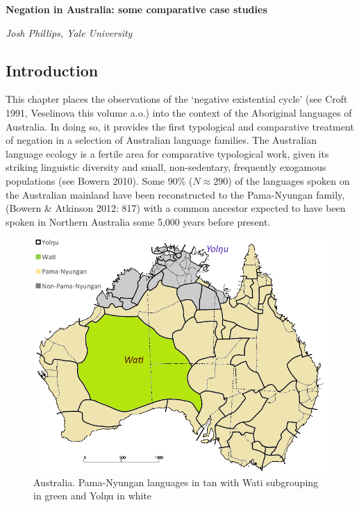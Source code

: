 \documentclass[10.5pt]{article}
\begin{document}
{\large \textbf{Negation in Australia: some comparative case studies}}

\textit{Josh Phillips, Yale University}

\subsection*{Introduction}
This chapter places the observations of the `negative existential cycle' (see Croft 1991, Veselinova this volume a.o.) into the context of the Aboriginal languages of Australia. In doing so, it provides the first typological and comparative treatment of negation in a selection of Australian language families. The Australian language ecology is a fertile area for comparative typological work, given its striking linguistic diversity and small, non-sedentary, frequently exogamous populations (see Bowern 2010). Some 90\% ($N\approx290$) of the languages spoken on the Australian mainland have been reconstructed to the Pama-Nyungan family, (Bowern \& Atkinson 2012: 817) with a common ancestor expected to have been spoken in Northern Australia some 5,000 years before present.


\begin{figure}
	\label{map}
	
	\includegraphics[scale=0.35]{map.png}
	\caption{Australia. Pama-Nyungan languages in tan with Wati subgrouping in green and Yolŋu in white}
\end{figure}
\end{document}
